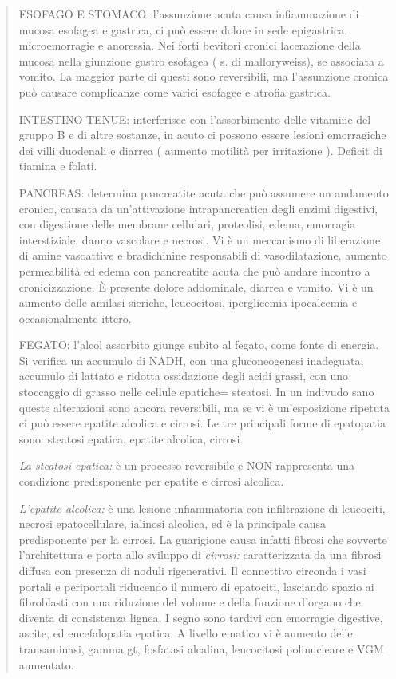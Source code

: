 \documentclass[]{article}
\begin{document}
\begin{quote}
ESOFAGO E STOMACO: l'assunzione acuta causa infiammazione di mucosa
esofagea e gastrica, ci può essere dolore in sede epigastrica,
microemorragie e anoressia. Nei forti bevitori cronici lacerazione della
mucosa nella giunzione gastro esofagea ( s. di malloryweiss), se
associata a vomito. La maggior parte di questi sono reversibili, ma
l'assunzione cronica può causare complicanze come varici esofagee e
atrofia gastrica.

INTESTINO TENUE: interferisce con l'assorbimento delle vitamine del
gruppo B e di altre sostanze, in acuto ci possono essere lesioni
emorragiche dei villi duodenali e diarrea ( aumento motilità per
irritazione ). Deficit di tiamina e folati.

PANCREAS: determina pancreatite acuta che può assumere un andamento
cronico, causata da un'attivazione intrapancreatica degli enzimi
digestivi, con digestione delle membrane cellulari, proteolisi, edema,
emorragia interstiziale, danno vascolare e necrosi. Vi è un meccanismo
di liberazione di amine vasoattive e bradichinine responsabili di
vasodilatazione, aumento permeabilità ed edema con pancreatite acuta che
può andare incontro a cronicizzazione. È presente dolore addominale,
diarrea e vomito. Vi è un aumento delle amilasi sieriche, leucocitosi,
iperglicemia ipocalcemia e occasionalmente ittero.

FEGATO: l'alcol assorbito giunge subito al fegato, come fonte di
energia. Si verifica un accumulo di NADH, con una gluconeogenesi
inadeguata, accumulo di lattato e ridotta ossidazione degli acidi
grassi, con uno stoccaggio di grasso nelle cellule epatiche= steatosi.
In un indivudo sano queste alterazioni sono ancora reversibili, ma se vi
è un'esposizione ripetuta ci può essere epatite alcolica e cirrosi. Le
tre principali forme di epatopatia sono: steatosi epatica, epatite
alcolica, cirrosi.

\emph{La steatosi epatica:} è un processo reversibile e NON rappresenta
una condizione predisponente per epatite e cirrosi alcolica.

\emph{L'epatite alcolica:} è una lesione infiammatoria con infiltrazione
di leucociti, necrosi epatocellulare, ialinosi alcolica, ed è la
principale causa predisponente per la cirrosi. La guarigione causa
infatti fibrosi che sovverte l'architettura e porta allo sviluppo di
\emph{cirrosi:} caratterizzata da una fibrosi diffusa con presenza di
noduli rigenerativi. Il connettivo circonda i vasi portali e periportali
riducendo il numero di epatociti, lasciando spazio ai fibroblasti con
una riduzione del volume e della funzione d'organo che diventa di
consistenza lignea. I segno sono tardivi con emorragie digestive,
ascite, ed encefalopatia epatica. A livello ematico vi è aumento delle
transaminasi, gamma gt, fosfatasi alcalina, leucocitosi polinucleare e
VGM aumentato.


\end{quote}
\end{document}
